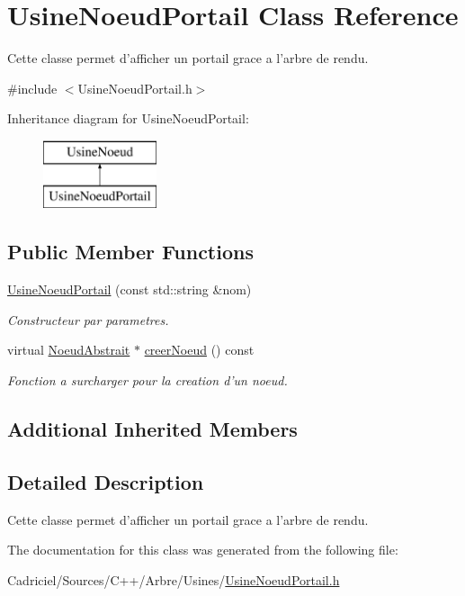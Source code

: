\hypertarget{class_usine_noeud_portail}{\section{Usine\-Noeud\-Portail Class Reference}
\label{class_usine_noeud_portail}
}


Cette classe permet d'afficher un portail grace a l'arbre de rendu.  




{\ttfamily \#include $<$Usine\-Noeud\-Portail.\-h$>$}

Inheritance diagram for Usine\-Noeud\-Portail\-:\begin{figure}[H]
\begin{center}
\leavevmode
\includegraphics[height=2.000000cm]{class_usine_noeud_portail}
\end{center}
\end{figure}
\subsection*{Public Member Functions}
\begin{DoxyCompactItemize}
\item 
\hyperlink{group__inf2990_ga7d0e963f0f08f6f4544df420b9a747f4}{Usine\-Noeud\-Portail} (const std\-::string \&nom)
\begin{DoxyCompactList}\small\item\em Constructeur par parametres. \end{DoxyCompactList}\item 
virtual \hyperlink{class_noeud_abstrait}{Noeud\-Abstrait} $\ast$ \hyperlink{group__inf2990_gaf6eec2bb7996beba8c59cb9720567d55}{creer\-Noeud} () const 
\begin{DoxyCompactList}\small\item\em Fonction a surcharger pour la creation d'un noeud. \end{DoxyCompactList}\end{DoxyCompactItemize}
\subsection*{Additional Inherited Members}


\subsection{Detailed Description}
Cette classe permet d'afficher un portail grace a l'arbre de rendu. 

The documentation for this class was generated from the following file\-:\begin{DoxyCompactItemize}
\item 
Cadriciel/\-Sources/\-C++/\-Arbre/\-Usines/\hyperlink{_usine_noeud_portail_8h}{Usine\-Noeud\-Portail.\-h}\end{DoxyCompactItemize}
